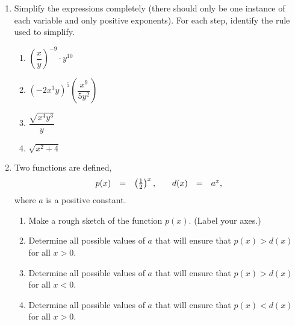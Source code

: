 \begin{enumerate}
\item Simplify the expressions completely (there should only be one
  instance of each variable and only positive exponents). For each
  step, identify the rule used to simplify.

\begin{enumerate}
\item $\left(\dfrac{x}{y}\right)^{-9}\cdot y^{10}$

  \vfill

\item $\left(-2x^3y\right)^5 \left(\dfrac{x^9}{5y^2}\right)$

  \vfill

\item $\dfrac{\sqrt{x^4y^3}}{y}$

  \vfill

\item $\sqrt{x^2+4}$

  \vfill

\end{enumerate}


\clearpage

\item Two functions are defined,
  \begin{equation*}
    \begin{array}{rcl@{\hspace{2em}}rcl}
      p(x) & = & \left(\frac{1}{2}\right)^{x}, & d(x) & = & a^x,
    \end{array}
  \end{equation*}
  where $a$ is a positive constant.
  \begin{enumerate}
  \item Make a rough sketch of the function $p(x)$. (Label your axes.)
    \vfill
  \item Determine all possible values of $a$ that will ensure that
    $p(x)>d(x)$ for all $x>0$.
    \vfill
  \item Determine all possible values of $a$ that will ensure that
    $p(x)>d(x)$ for all $x<0$.
    \vfill
  \item Determine all possible values of $a$ that will ensure that
    $p(x)<d(x)$ for all $x>0$.
    \vfill
  \end{enumerate}



\end{enumerate}



